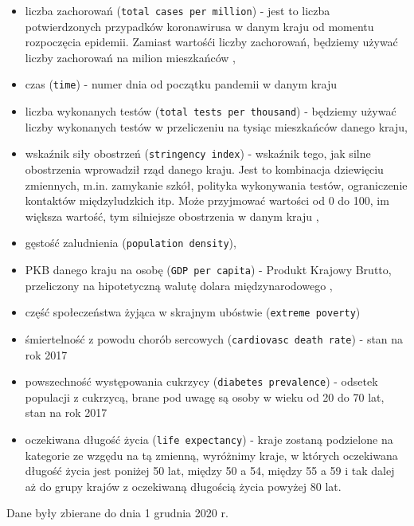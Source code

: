 \documentclass[12pt]{mwbk}
\theoremstyle{plain}
\theoremstyle{definition}
\theoremstyle{remark}
\newcommand\zrodlo[1]{\par\vspace{-3mm}{\small\textit{Źródło: }#1 }}
\begin{document}
\begin{itemize}
	\item liczba zachorowań (\texttt{total cases per million}) - jest to liczba potwierdzonych przypadków koronawirusa w danym kraju od momentu rozpoczęcia epidemii. Zamiast wartośći liczby zachorowań, będziemy używać liczby zachorowań na milion mieszkańców ,
	\item czas (\texttt{time}) - numer dnia od początku pandemii w danym kraju
	\item liczba wykonanych testów (\texttt{total tests per thousand}) - będziemy używać liczby wykonanych testów w przeliczeniu na tysiąc mieszkańców danego kraju,
	\item wskaźnik siły obostrzeń (\texttt{stringency index}) - wskaźnik tego, jak silne obostrzenia wprowadził rząd danego kraju. Jest to kombinacja dziewięciu zmiennych, m.in. zamykanie szkół, polityka wykonywania testów, ograniczenie kontaktów międzyludzkich itp. Może przyjmować wartości od 0 do 100, im większa wartość, tym silniejsze obostrzenia w danym kraju \cite{stringency},
	\item gęstość zaludnienia (\texttt{population density}),
	\item PKB danego kraju na osobę (\texttt{GDP per capita}) - Produkt Krajowy Brutto, przeliczony na hipotetyczną walutę dolara międzynarodowego \cite{dollars},
	\item część społeczeństwa żyjąca w skrajnym ubóstwie (\texttt{extreme poverty})
	\item śmiertelność z powodu chorób sercowych (\texttt{cardiovasc death rate}) - stan na rok 2017
	\item powszechność występowania cukrzycy (\texttt{diabetes prevalence}) - odsetek populacji z cukrzycą, brane pod uwagę są osoby w wieku od 20 do 70 lat, stan na rok 2017
	\item oczekiwana długość życia (\texttt{life expectancy}) - kraje zostaną podzielone na kategorie ze wzgędu na tą zmienną, wyróżnimy kraje, w których oczekiwana długość życia jest poniżej 50 lat, między 50 a 54, między 55 a 59 i tak dalej aż do grupy krajów z oczekiwaną długością życia powyżej 80 lat.
	
\end{itemize}

Dane były zbierane do dnia 1 grudnia 2020 r.

 
\end{document}
